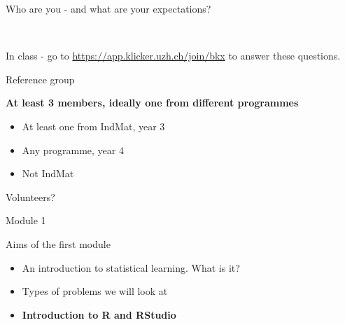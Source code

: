 \documentclass[10pt,ignorenonframetext,]{beamer}
\providecommand{\tightlist}{%
  \setlength{\itemsep}{0pt}\setlength{\parskip}{0pt}}
\begin{document}
\begin{frame}{Who are you - and what are your expectations?}

~

In class - go to \url{https://app.klicker.uzh.ch/join/bkx} to answer
these questions.

\end{frame}

\begin{frame}{Reference group}

\textbf{At least 3 members, ideally one from different programmes}

\begin{itemize}
\tightlist
\item
  At least one from IndMat, year 3
\item
  Any programme, year 4
\item
  Not IndMat
\end{itemize}

Volunteers?

\end{frame}

\begin{frame}{Module 1}

\begin{block}{Aims of the first module}

\begin{itemize}
\item
  An introduction to statistical learning. What is it?
\item
  Types of problems we will look at
\item
  \textbf{Introduction to R and RStudio } 
\end{itemize}

\end{block}

\end{frame}
\end{document}

